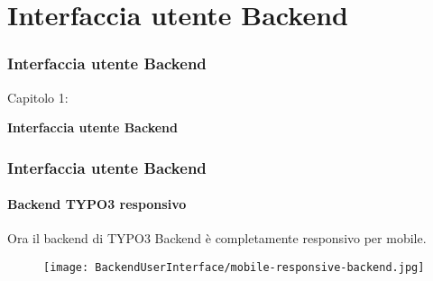 %

\section{Interfaccia utente Backend}
\begin{frame}[fragile]
	\frametitle{Interfaccia utente Backend}

	\begin{center}\huge{Capitolo 1:}\end{center}
	\begin{center}\huge{\color{typo3darkgrey}\textbf{Interfaccia utente Backend}}\end{center}

\end{frame}


\begin{frame}[fragile]
	\frametitle{Interfaccia utente Backend}
	\framesubtitle{Backend TYPO3 responsivo}

	Ora il backend di TYPO3 Backend è completamente responsivo per mobile.

	\begin{figure}
		\texttt{[image: BackendUserInterface/mobile-responsive-backend.jpg]}
	\end{figure}

\end{frame}



